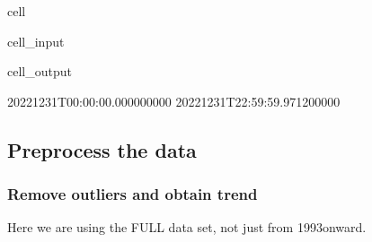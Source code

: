 \documentclass[letterpaper,10pt,english]{jupyterBook}
\begin{document}
\begin{sphinxuseclass}{cell}
\begin{sphinxVerbatimInput}
\begin{sphinxuseclass}{cell_input}
\begin{sphinxVerbatim}[commandchars=\\\{\}]
     
     

\PYG{p}{[}\PYG{p}{]}
\PYG{p}{[}\PYG{p}{]}
\end{sphinxVerbatim}

\end{sphinxuseclass}\end{sphinxVerbatimInput}
\begin{sphinxVerbatimOutput}

\begin{sphinxuseclass}{cell_output}
\begin{sphinxVerbatim}[commandchars=\\\{\}]
2022\PYGZhy{}12\PYGZhy{}31T00:00:00.000000000
2022\PYGZhy{}12\PYGZhy{}31T22:59:59.971200000
\end{sphinxVerbatim}

\end{sphinxuseclass}\end{sphinxVerbatimOutput}

\end{sphinxuseclass}

\subsection{Pre\sphinxhyphen{}process the data}
\label{\detokenize{notebooks/regional_and_local/SL_Extremes_annual:pre-process-the-data}}

\subsubsection{Remove outliers and obtain trend}
\label{\detokenize{notebooks/regional_and_local/SL_Extremes_annual:remove-outliers-and-obtain-trend}}
\sphinxAtStartPar
Here we are using the FULL data set, not just from 1993\sphinxhyphen{}onward.
\end{document}
